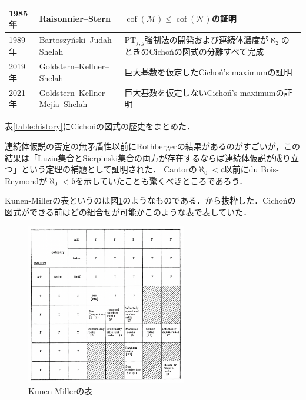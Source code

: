 \documentclass[uplatex,dvipdfmx]{jsarticle}
\newcommand{\cof}{\operatorname{cof}}
\newcommand{\nul}{\mathcal{N}}
\newcommand{\meager}{\mathcal{M}}
\newcommand{\frakc}{\mathfrak{c}}
\newcommand{\frakb}{\mathfrak{b}}
\theoremstyle{definition}
\begin{document}
\begin{table}[p]
\begin{tabular}{@{} l|l|p{8cm}}
			1985年 & Raisonnier--Stern                 & $\cof(\meager) \le \cof(\nul)$の証明                                                                                                                         \\ \hline
			1989年 & Bartoszyński--Judah--Shelah       & $\mathrm{PT}_{f,g}$強制法の開発および連続体濃度が$\aleph_2$のときのCichońの図式の分離すべて完成                                                 \\ \hline
			2019年 & Goldstern--Kellner--Shelah         & 巨大基数を仮定したCichoń's maximumの証明                                                                                                                              \\ \hline
			2021年 & Goldstern--Kellner--Mejía--Shelah & 巨大基数を仮定しないCichoń's maximumの証明                                                                                                                             
		\end{tabular}
	\end{table}

	表\ref{table:history}にCichońの図式の歴史をまとめた．
	
	連続体仮説の否定の無矛盾性以前にRothbergerの結果があるのがすごいが，この結果は「Luzin集合とSierpinski集合の両方が存在するならば連続体仮説が成り立つ」という定理の補題として証明された．
	Cantorの$\aleph_0 < \frakc$以前にdu Bois-Reymondが$\aleph_0 < \frakb$を示していたことも驚くべきところであろう．
	
	Kunen-Millerの表というのは図\ref{fig:kunen-miller}のようなものである．\cite{Miller1981SomePO}から抜粋した．Cichońの図式ができる前はどの組合せが可能かこのような表で表していた．
	
	\begin{figure}[p]\label{fig:kunen-miller}
		\begin{center}
		\includegraphics[width=7cm]{kunen-miller.png}
		\caption{Kunen-Millerの表}
		\end{center}
	\end{figure}
	
\end{document}
